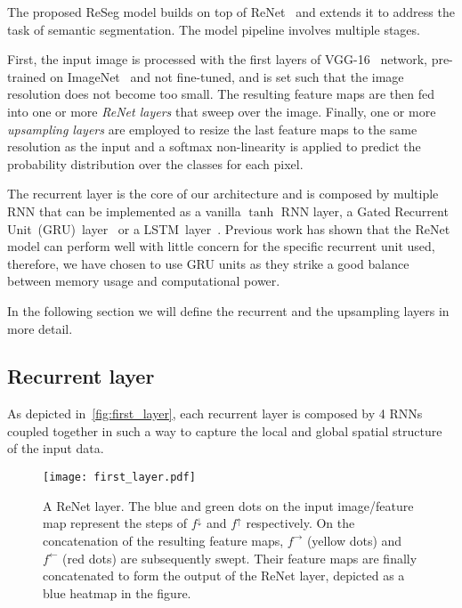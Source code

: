 \documentclass[times,art10,twocolumn,latex8]{article}
\begin{document}
The proposed ReSeg model builds on top of ReNet~\cite{visin2015renet} and
extends it to address the task of semantic segmentation. The model
pipeline involves multiple stages.

First, the input image is processed with the first layers of
VGG-16~\cite{Simonyan2015} network, pre-trained on
ImageNet~\cite{imagenet_cvpr09} and not fine-tuned, and is set such that the
image resolution does not become too small. The resulting feature maps are then
fed into one or more \emph{ReNet layers} that sweep over the image. Finally,
one or more \emph{upsampling layers} are employed to resize the last feature
maps to the same resolution as the input and a softmax non-linearity is applied
to predict the probability distribution over the classes for each pixel.

The recurrent layer is the core of our architecture and is composed by multiple
RNN that can be implemented as a vanilla $\tanh$ RNN layer, a Gated Recurrent
Unit~(GRU)~layer~\cite{Cho2014} or a
LSTM~layer~\cite{Hochreiter+Schmidhuber-1997}. Previous work has shown that
the ReNet model can perform well with little concern for the specific recurrent
unit used, therefore, we have chosen to use GRU units as they strike a good
balance between memory usage and computational power.

In the following section we will define the recurrent and the upsampling layers
in more detail.

\subsection{Recurrent layer}
As depicted in~\autoref{fig:first_layer}, each recurrent layer is composed
by 4 RNNs coupled together in such a way to capture the local and global
spatial structure of the input data.



\begin{figure}[t]
    \begin{center}
        \texttt{[image: first\_layer.pdf]}
        \caption{A ReNet layer. The blue and green dots on the input
            image/feature map represent the steps of $f^{\downarrow}$ and
            $f^{\uparrow}$ respectively. On the concatenation of the resulting
            feature maps, $f^{\rightarrow}$ (yellow dots) and $f^{\leftarrow}$
            (red dots) are subsequently swept. Their feature maps are finally
            concatenated to form the output of the ReNet layer, depicted as a
            blue heatmap in the figure.}
        \label{fig:first_layer}
        \vspace{-5mm}
    \end{center}
\end{figure}
\end{document}
